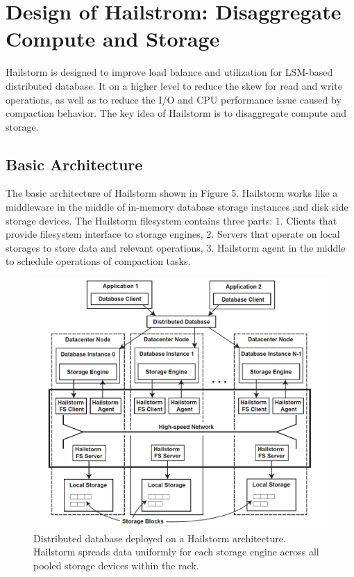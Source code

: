\documentclass[a4paper,10pt,twoside]{article}
\begin{document}
\section{Design of Hailstrom: Disaggregate Compute and Storage}

Hailstorm is designed to improve load balance and utilization for LSM-based distributed database.
It on a higher level to reduce the skew for read and write operations, as well as to reduce the I/O and CPU performance issue caused by compaction behavior.
The key idea of Hailstorm is to disaggregate compute and storage.

\subsection{Basic Architecture}
\par
The basic architecture of Hailstorm shown in Figure 5. 
Hailstorm works like a middleware in the middle of in-memory database storage instances and disk side storage devices.
The Hailstorm filesystem contains three parts:
1. Clients that provide filesystem interface to storage engines,
2. Servers that operate on local storages to store data and relevant operations,
3. Hailstorm agent in the middle to schedule operations of compaction tasks.

\begin{figure}[h]
    \centering
	\includegraphics[scale=0.3]{Hailstorm2.png}
    \caption{ Distributed database deployed on a Hailstorm architecture.
	Hailstorm spreads data uniformly for each storage engine
	across all pooled storage devices within the rack.}
    \label{fig:mesh1}
\end{figure}
\end{document}
